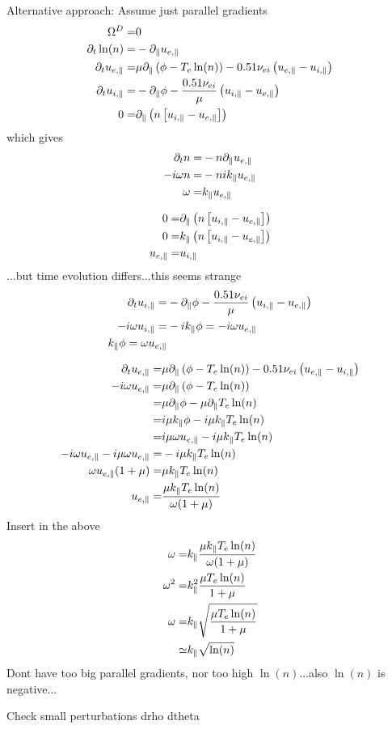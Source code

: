 Alternative approach:
Assume just parallel gradients
\begin{align*}
\Om^D =&
0
\\
%
%
%
\partial_t \ln(n)
=&
- \partial_\|u_{e,\|}
\\
%
%
%
\partial_t u_{e,\|}
 =&
 \mu \partial_\| \L(\phi - T_e  \ln(n)\R)
 - 0.51 \nu_{ei} \L(u_{e,\|}-u_{i,\|}\R)
\\
%
%
%
\partial_t u_{i,\|}
 =&
 - \partial_\|\phi
 - \frac{ 0.51 \nu_{ei} }{ \mu } \L(u_{i,\|}-u_{e,\|}\R)
\\
%
%
%
 0
  =&
 \partial_\| \L(n\L[ u_{i,\|} - u_{e,\|} \R]\R)
\end{align*}
which gives
\begin{align*}
    \partial_t n
=&
- n\partial_\|u_{e,\|}
\\
-i\omega n
=&
- nik_\|u_{e,\|}
\\
\omega
=&
k_\|u_{e,\|}
\end{align*}

\begin{align*}
 0
  =&
 \partial_\| \left(n\left[ u_{i,\|} - u_{e,\|} \right]\right)
 \\
 0
  =&
  k_\| \left(n\left[ u_{i,\|} - u_{e,\|} \right]\right)
 \\
 u_{e,\|}
  =&
  u_{i,\|}
\end{align*}
%
...but time evolution differs...this seems strange
%
\begin{align*}
\partial_t u_{i,\|}
 =&
 - \partial_\|\phi
 - \frac{ 0.51 \nu_{ei} }{ \mu } \left(u_{i,\|}-u_{e,\|}\right)
 \\
 -i\omega u_{i,\|}
 =&
 - ik_\|\phi
 =
 -i\omega u_{e,\|}
 \\
 k_\|\phi
 =
 \omega u_{e,\|}
\end{align*}

\begin{align*}
\partial_t u_{e,\|}
 =&
 \mu \partial_\| \left(\phi - T_e  \ln(n)\right)
 - 0.51 \nu_{ei} \left(u_{e,\|}-u_{i,\|}\right)
 \\
 -i\omega u_{e,\|}
 =&
 \mu \partial_\| \left(\phi - T_e  \ln(n)\right)
 \\
 =&
 \mu \partial_\| \phi
 - \mu \partial_\| T_e  \ln(n)
 \\
 =&
 i\mu k_\| \phi
 - i\mu k_\| T_e  \ln(n)
 \\
 =&
 i\mu  \omega u_{e,\|}
 - i\mu k_\| T_e  \ln(n)
 \\
 -i\omega u_{e,\|}
 - i\mu  \omega u_{e,\|}
 =&
 - i\mu k_\| T_e  \ln(n)
 \\
 \omega u_{e,\|}(1 + \mu)
 =&
 \mu k_\| T_e  \ln(n)
 \\
  u_{e,\|}
 =&
 \frac{\mu k_\| T_e  \ln(n)}{ \omega(1 + \mu) }
\end{align*}
Insert in the above
\begin{align*}
\omega
=&
k_\|\frac{\mu k_\| T_e  \ln(n)}{ \omega(1 + \mu) }
\\
\omega^2
=&
k_\|^2\frac{\mu T_e  \ln(n)}{ 1 + \mu }
\\
\omega
=&
k_\|\sqrt{\frac{\mu T_e  \ln(n)}{ 1 + \mu }}
\\
\simeq&
k_\|\sqrt{\ln(n)}
\end{align*}
Dont have too big parallel gradients, nor too high $\ln(n)$...also $\ln(n)$ is
negative...

Check small perturbations
drho dtheta
